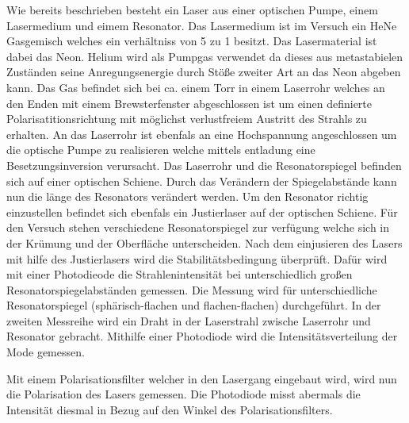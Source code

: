 Wie bereits beschrieben besteht ein Laser aus einer optischen Pumpe, einem Lasermedium und eimem Resonator.
Das Lasermedium ist im Versuch ein HeNe Gasgemisch welches ein verhältniss von 5 zu 1 besitzt.
Das Lasermaterial ist dabei das Neon.
Helium wird als Pumpgas verwendet da dieses aus metastabielen Zuständen seine Anregungsenergie durch Stöße zweiter Art an das Neon abgeben kann.
Das Gas befindet sich bei ca. einem Torr in einem Laserrohr welches an den Enden mit einem Brewsterfenster abgeschlossen ist um einen
definierte Polarisatitionsrichtung mit möglichst verlustfreiem Austritt des Strahls zu erhalten.
An das Laserrohr ist ebenfals an eine Hochspannung angeschlossen um die optische Pumpe zu realisieren welche mittels entladung eine Besetzungsinversion verursacht.
Das Laserrohr und die Resonatorspiegel befinden sich auf einer optischen Schiene.
Durch das Verändern der Spiegelabstände kann nun die länge des Resonators verändert werden.
Um den Resonator richtig einzustellen befindet sich ebenfals ein Justierlaser auf der optischen Schiene.
Für den Versuch stehen verschiedene Resonatorspiegel zur verfügung welche sich in der Krümung und der Oberfläche unterscheiden.
Nach dem einjusieren des Lasers mit hilfe des Justierlasers wird die Stabilitätsbedingung überprüft.
Dafür wird mit einer Photodieode die Strahlenintensität bei unterschiedlich großen Resonatorspiegelabständen gemessen.
Die Messung wird für unterschiedliche Resonatorspiegel  (sphärisch-flachen und flachen-flachen) durchgeführt.
In der zweiten Messreihe wird ein Draht in der Laserstrahl zwische Laserrohr und Resonator gebracht.
Mithilfe einer Photodiode wird die Intensitätsverteilung der Mode gemessen.

Mit einem Polarisationsfilter welcher in den Lasergang eingebaut wird, wird nun die Polarisation des Lasers gemessen.
Die Photodiode misst abermals die Intensität diesmal in Bezug auf den Winkel des Polarisationsfilters.

